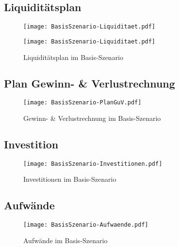 \newpage
\subsection{Liquiditätsplan}
\begin{figure}[htp!]
	\centering
	\texttt{[image: BasisSzenario-Liquiditaet.pdf]}
	\label{fig:BasisSzenario-Liquiditaet-1}
\end{figure}
\begin{figure}[htp!]
	\centering
	\texttt{[image: BasisSzenario-Liquiditaet.pdf]}
	\caption{Liquiditätsplan im Basis-Szenario}
	\label{fig:BasisSzenario-Liquiditaet-2}
\end{figure}

\newpage
\subsection{Plan Gewinn- \& Verlustrechnung}
\begin{figure}[htp!]
	\centering
	\texttt{[image: BasisSzenario-PlanGuV.pdf]}
	\caption{Gewinn- \& Verlustrechnung im Basis-Szenario}
	\label{fig:BasisSzenario-GuV}
\end{figure}

\newpage
\subsection{Investition}
\begin{figure}[htp!]
	\centering
	\texttt{[image: BasisSzenario-Investitionen.pdf]}
	\caption{Investitionen im Basis-Szenario}
	\label{fig:BasisSzenario-Investitionen}
\end{figure}

\begin{landscape}
	\subsection{Aufwände}
	\begin{figure}[htp!]
		\centering
		\texttt{[image: BasisSzenario-Aufwaende.pdf]}
		\caption{Aufwände im Basis-Szenario}
		\label{fig:BasisSzenario-Aufwaende}
	\end{figure}
\end{landscape}

\newpage
